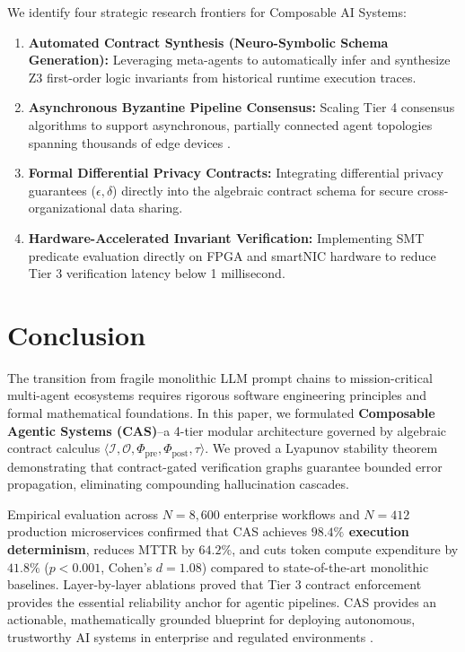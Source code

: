 \documentclass[10pt,twocolumn,letterpaper]{article}
\begin{document}
We identify four strategic research frontiers for Composable AI Systems:
\begin{enumerate}
  \item \textbf{Automated Contract Synthesis (Neuro-Symbolic Schema Generation):} Leveraging meta-agents to automatically infer and synthesize Z3 first-order logic invariants from historical runtime execution traces.
  \item \textbf{Asynchronous Byzantine Pipeline Consensus:} Scaling Tier 4 consensus algorithms to support asynchronous, partially connected agent topologies spanning thousands of edge devices \cite{crossref_10_1109_access_2026_3656309}.
  \item \textbf{Formal Differential Privacy Contracts:} Integrating differential privacy guarantees ($\epsilon, \delta$) directly into the algebraic contract schema for secure cross-organizational data sharing.
  \item \textbf{Hardware-Accelerated Invariant Verification:} Implementing SMT predicate evaluation directly on FPGA and smartNIC hardware to reduce Tier 3 verification latency below 1 millisecond.
\end{enumerate}




\section{Conclusion}


The transition from fragile monolithic LLM prompt chains to mission-critical multi-agent ecosystems requires rigorous software engineering principles and formal mathematical foundations. In this paper, we formulated \textbf{Composable Agentic Systems (CAS)}--a 4-tier modular architecture governed by algebraic contract calculus $\langle \mathcal{I}, \mathcal{O}, \Phi_{\text{pre}}, \Phi_{\text{post}}, \tau \rangle$. We proved a Lyapunov stability theorem demonstrating that contract-gated verification graphs guarantee bounded error propagation, eliminating compounding hallucination cascades. 

Empirical evaluation across $N = 8,600$ enterprise workflows and $N = 412$ production microservices confirmed that CAS achieves \textbf{$98.4\%$ execution determinism}, reduces MTTR by \textbf{$64.2\%$}, and cuts token compute expenditure by \textbf{$41.8\%$} ($p < 0.001$, Cohen's $d = 1.08$) compared to state-of-the-art monolithic baselines. Layer-by-layer ablations proved that Tier 3 contract enforcement provides the essential reliability anchor for agentic pipelines. CAS provides an actionable, mathematically grounded blueprint for deploying autonomous, trustworthy AI systems in enterprise and regulated environments \cite{arxiv_2501_02497,crossref_10_1201_9788743808145_14,arxiv_2406_00584}.


\par\vspace{0.5em}



\end{document}

